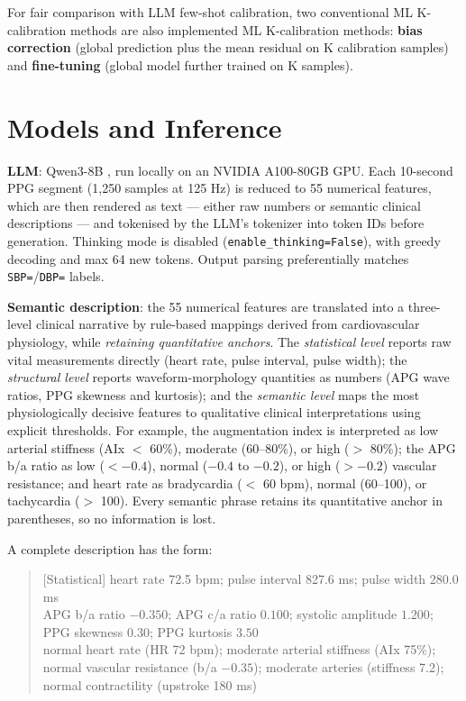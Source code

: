 For fair comparison with LLM few-shot calibration, two conventional ML K-calibration methods are also implemented ML K-calibration methods: \textbf{bias correction} (global prediction plus the mean residual on K calibration samples) and \textbf{fine-tuning} (global model further trained on K samples).

\section{Models and Inference}

\textbf{LLM}: Qwen3-8B \citep{qwen3_2025}, run locally on an NVIDIA A100-80GB GPU. Each 10-second PPG segment (1,250 samples at 125 Hz) is reduced to 55 numerical features, which are then rendered as text --- either raw numbers or semantic clinical descriptions --- and tokenised by the LLM's tokenizer into token IDs before generation. Thinking mode is disabled (\texttt{enable\_thinking=False}), with greedy decoding and max 64 new tokens. Output parsing preferentially matches \texttt{SBP=}/\texttt{DBP=} labels.

\textbf{Semantic description}: the 55 numerical features are translated into a three-level clinical narrative by rule-based mappings derived from cardiovascular physiology, while \emph{retaining quantitative anchors}. The \emph{statistical level} reports raw vital measurements directly (heart rate, pulse interval, pulse width); the \emph{structural level} reports waveform-morphology quantities as numbers (APG wave ratios, PPG skewness and kurtosis); and the \emph{semantic level} maps the most physiologically decisive features to qualitative clinical interpretations using explicit thresholds. For example, the augmentation index is interpreted as low arterial stiffness (AIx $<$ 60\%), moderate (60--80\%), or high ($>$ 80\%); the APG b/a ratio as low ($< -0.4$), normal ($-0.4$ to $-0.2$), or high ($> -0.2$) vascular resistance; and heart rate as bradycardia ($<$ 60 bpm), normal (60--100), or tachycardia ($>$ 100). Every semantic phrase retains its quantitative anchor in parentheses, so no information is lost.

A complete description has the form:

\begin{quote}
\small
[Statistical] heart rate 72.5 bpm; pulse interval 827.6 ms; pulse width 280.0 ms\\
[Structural] APG b/a ratio $-0.350$; APG c/a ratio $0.100$; systolic amplitude $1.200$; PPG skewness $0.30$; PPG kurtosis $3.50$\\
[Semantic] normal heart rate (HR 72 bpm); moderate arterial stiffness (AIx 75\%); normal vascular resistance (b/a $-0.35$); moderate arteries (stiffness 7.2); normal contractility (upstroke 180 ms)
\end{quote}

